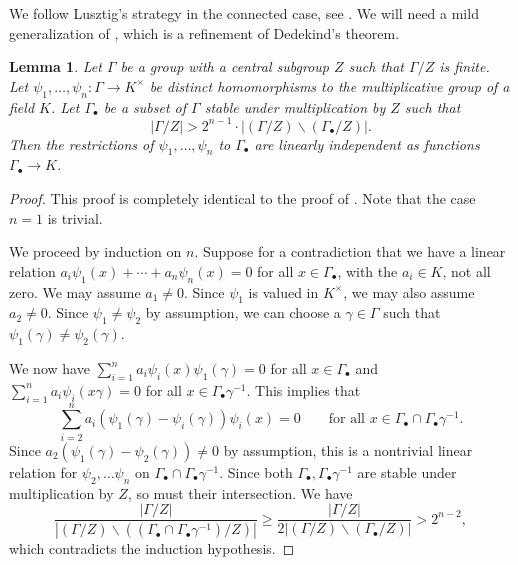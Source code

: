 \documentclass{amsart}
\newcommand{\from}{\colon}
\theoremstyle{plain}
\newtheorem{lemma}[thm]{Lemma}
\theoremstyle{definition}
\theoremstyle{remark}
\theoremstyle{theorem}
\begin{document}
We follow Lusztig's strategy in the connected case, see \cite{Lus20}.
We will need a mild generalization of \cite[Lemma 8.1]{Lus90}, which is a refinement of Dedekind's theorem.

\begin{lemma}\label{lem:Lusztig-Dedekind}
Let $\Gamma$ be a group with a central subgroup $Z$ such that $\Gamma/Z$ is finite.
Let $\psi_1, \ldots, \psi_n \from \Gamma \to K^\times$ be distinct homomorphisms to the multiplicative group of a field $K$.
Let $\Gamma_{\bullet}$ be a subset of $\Gamma$ stable under multiplication by $Z$ such that 
    \begin{equation*}
        |\Gamma/Z| > 2^{n-1} \cdot |(\Gamma/Z) \smallsetminus (\Gamma_{\bullet}/Z)|.
    \end{equation*} 
    Then the restrictions of $\psi_1, \ldots, \psi_n$ to $\Gamma_{\bullet}$ are linearly independent as functions $\Gamma_{\bullet} \to K$.
\end{lemma}

\begin{proof}   
    This proof is completely identical to the proof of \cite[Lemma 8.1]{Lus90}. Note that the case $n = 1$ is trivial. 
    
    We proceed by induction on $n$. Suppose for a contradiction that we have a linear relation $a_i \psi_1(x) + \cdots + a_n \psi_n(x) = 0$ for all $x \in \Gamma_{\bullet}$, with the $a_i \in K$, not all zero. We may assume $a_1 \neq 0$. Since $\psi_1$ is valued in $K^\times$, we may also assume $a_2 \neq 0$. Since $\psi_1 \neq \psi_2$ by assumption, we can choose a $\gamma \in \Gamma$ such that $\psi_1(\gamma) \neq \psi_2(\gamma)$. 

    We now have $\sum_{i=1}^n a_i \psi_i(x) \psi_1(\gamma) = 0$ for all $x \in \Gamma_{\bullet}$ and $\sum_{i=1}^n a_i \psi_i(x\gamma) = 0$ for all $x \in \Gamma_{\bullet} \gamma^{-1}$. This implies that
    \begin{equation*}
        \sum_{i=2}^n a_i(\psi_1(\gamma) - \psi_i(\gamma)) \psi_i(x) = 0 \qquad \text{for all $x \in \Gamma_{\bullet} \cap \Gamma_{\bullet} \gamma^{-1}$}.
    \end{equation*}
    Since $a_2(\psi_1(\gamma) - \psi_2(\gamma)) \neq 0$ by assumption, this is a nontrivial linear relation for $\psi_2, \ldots \psi_n$ on $\Gamma_{\bullet} \cap \Gamma_{\bullet} \gamma^{-1}$. Since both $\Gamma_{\bullet},\Gamma_{\bullet}\gamma^{-1}$ are stable under multiplication by $Z$, so must their intersection. We have
    \begin{equation*}
        \frac{|\Gamma/Z|}{|(\Gamma/Z) \smallsetminus ((\Gamma_{\bullet} \cap \Gamma_{\bullet} \gamma^{-1})/Z)|}
        \geq \frac{|\Gamma/Z|}{2|(\Gamma/Z) \smallsetminus (\Gamma_{\bullet}/Z)|} > 2^{n-2},
    \end{equation*}
    which contradicts the induction hypothesis.
\end{proof}
\end{document}
